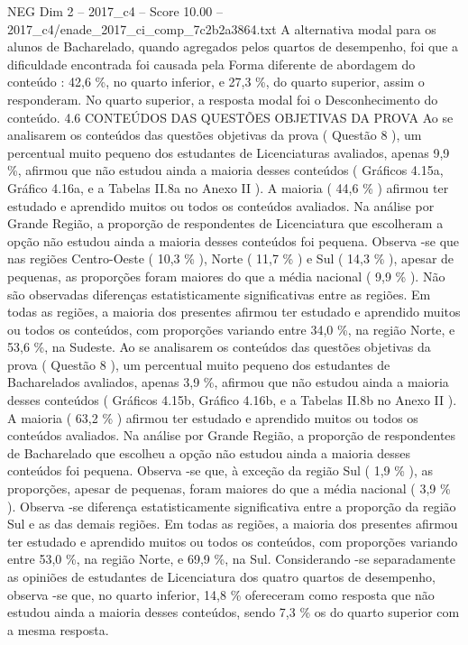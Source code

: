 \begin{textsample}{NEG Dim 2 – 2017\_c4 – Score 10.00 – 2017\_c4/enade\_2017\_ci\_comp\_7c2b2a3864.txt}
A alternativa modal para os alunos de Bacharelado, quando agregados pelos quartos de desempenho, foi que a dificuldade encontrada foi causada pela Forma diferente de abordagem do conteúdo : 42,6 \%, no quarto inferior, e 27,3 \%, do quarto superior, assim o responderam.
No quarto superior, a resposta modal foi o Desconhecimento do conteúdo. 4.6 CONTEÚDOS DAS QUESTÕES OBJETIVAS DA PROVA Ao se analisarem os conteúdos das questões objetivas da prova ( Questão 8 ), um percentual muito pequeno dos estudantes de Licenciaturas avaliados, apenas 9,9 \%, afirmou que não estudou ainda a maioria desses conteúdos ( Gráficos 4.15a, Gráfico 4.16a, e a Tabelas II.8a no Anexo II ).
A maioria ( 44,6 \% ) afirmou ter estudado e aprendido muitos ou todos os conteúdos avaliados.
Na análise por Grande Região, a proporção de respondentes de Licenciatura que escolheram a opção não estudou ainda a maioria desses conteúdos foi pequena.
Observa -se que nas regiões Centro-Oeste ( 10,3 \% ), Norte ( 11,7 \% ) e Sul ( 14,3 \% ), apesar de pequenas, as proporções foram maiores do que a média nacional ( 9,9 \% ).
Não são observadas diferenças estatisticamente significativas entre as regiões.
Em todas as regiões, a maioria dos presentes afirmou ter estudado e aprendido muitos ou todos os conteúdos, com proporções variando entre 34,0 \%, na região Norte, e 53,6 \%, na Sudeste.
Ao se analisarem os conteúdos das questões objetivas da prova ( Questão 8 ), um percentual muito pequeno dos estudantes de Bacharelados avaliados, apenas 3,9 \%, afirmou que não estudou ainda a maioria desses conteúdos ( Gráficos 4.15b, Gráfico 4.16b, e a Tabelas II.8b no Anexo II ).
A maioria ( 63,2 \% ) afirmou ter estudado e aprendido muitos ou todos os conteúdos avaliados.
Na análise por Grande Região, a proporção de respondentes de Bacharelado que escolheu a opção não estudou ainda a maioria desses conteúdos foi pequena.
Observa -se que, à exceção da região Sul ( 1,9 \% ), as proporções, apesar de pequenas, foram maiores do que a média nacional ( 3,9 \% ).
Observa -se diferença estatisticamente significativa entre a proporção da região Sul e as das demais regiões.
Em todas as regiões, a maioria dos presentes afirmou ter estudado e aprendido muitos ou todos os conteúdos, com proporções variando entre 53,0 \%, na região Norte, e 69,9 \%, na Sul.
Considerando -se separadamente as opiniões de estudantes de Licenciatura dos quatro quartos de desempenho, observa -se que, no quarto inferior, 14,8 \% ofereceram como resposta que não estudou ainda a maioria desses conteúdos, sendo 7,3 \% os do quarto superior com a mesma resposta.

\end{textsample}

